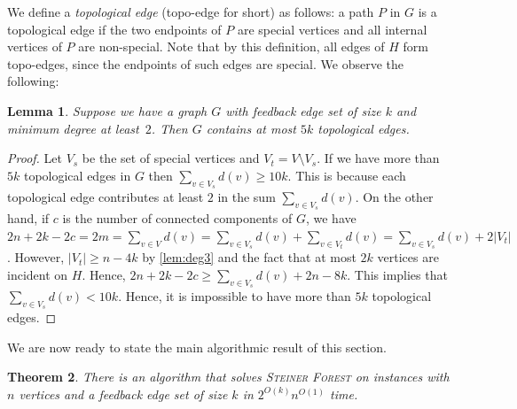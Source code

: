 \documentclass[a4paper]{article}
\theoremstyle{plain}
\newtheorem{theorem}{Theorem}%
\newtheorem{lemma}[theorem]{Lemma}%
\newcommand{\pname}[1]{\textsc{#1}}
\newcommand{\SF}{\pname{Steiner Forest}\xspace}
\begin{document}
We define a \emph{topological edge} (topo-edge for short) as follows: a path
$P$ in $G$ is a topological edge if the two endpoints of $P$ are special
vertices and all internal vertices of $P$ are non-special. Note that by this
definition, all edges of $H$ form topo-edges, since the endpoints of such edges
are special.  We observe the following:

\begin{lemma}\label{lem:topo} %
Suppose we have a graph $G$ with
feedback edge set of size $k$ and minimum degree at least~$2$. Then $G$
contains at most $5k$ topological edges.  
\end{lemma}

%

\begin{proof}%
Let $V_s$ be the set of special
vertices and $V_t=V\setminus V_s$. If we have more than $5k$ topological edges
in $G$ then $\sum_{v\in V_s}d(v)\ge 10k$. This is because each topological edge
contributes at least $2$ in the sum $\sum_{v\in V_s}d(v)$.  On the other hand,
if $c$ is the number of connected components of $G$, we have $2n+2k-2c = 2m =
\sum_{v\in V}d(v) = \sum_{v\in V_s}d(v) + \sum_{v\in V_t} d(v) = \sum_{v\in
V_s} d(v) +2|V_t|$.  However, $|V_t|\ge n-4k$ by \cref{lem:deg3} and the fact
that at most $2k$ vertices are incident on $H$.  Hence, $2n+2k-2c\ge \sum_{v\in
V_s}d(v) +2n-8k$.  This implies that $\sum_{v\in V_s}d(v)<10k$.  Hence, it is
impossible to have more than $5k$ topological edges. \end{proof}
%

We are now ready to state the main algorithmic result of this section.

\begin{theorem} 
There is an algorithm that solves \SF on instances with $n$
vertices and a feedback edge set of size $k$ in $2^{O(k)}n^{O(1)}$ time. 
\end{theorem}
\end{document}
